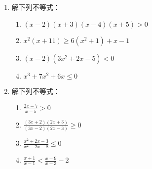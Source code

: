 \begin{ex}
 \begin{enumerate}
     \item 解下列不等式：
\begin{enumerate}
    \item $(x-2)(x+3)(x-4)(x+5)>0$
    \item $x^2(x+11)\ge 6(x^2+1)+x-1$
    \item $(x-2)(3x^2+2x-5)<0$
    \item $x^3+7x^2+6x\le 0$
\end{enumerate}
     \item      解下列不等式：
    \begin{multicols}{2}
\begin{enumerate}
    \item $\frac{2x-7}{x-5}>0$
    \item $\frac{(3x+2)(2x+3)}{(3x-2)(2x-3)}\ge 0$
    \item $\frac{x^2+2x-3}{x^2-2x-8}\le 0$
    \item $\frac{x+1}{x-1}<\frac{x-9}{x-3}-2$
\end{enumerate}        
    \end{multicols}
 \end{enumerate}   
\end{ex}


